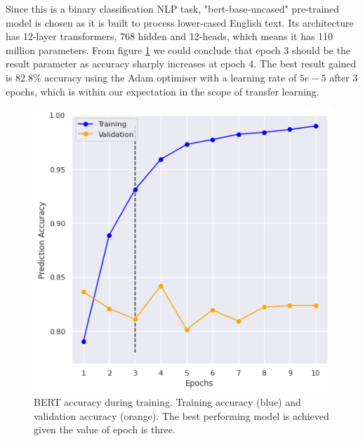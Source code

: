 \documentclass[journal, ]{IEEEtran}
\let\MYoriglatexcaption\caption
\renewcommand{\caption}[2][\relax]{\MYoriglatexcaption[#2]{#2}}
\begin{document}
Since this is a binary classification NLP task, "bert-base-uncased" pre-trained model is chosen as it is built to process lower-cased English text. Its architecture has 12-layer transformers, 768 hidden and 12-heads, which means it has 110 million parameters. From figure \ref{fig:bert_acc} we could conclude that epoch 3 should be the result parameter as accuracy sharply increases at epoch 4. The best result gained is $82.8$\% accuracy using the Adam optimiser with a learning rate of $5e-5$ after $3$ epochs, which is within our expectation in the scope of transfer learning.



\begin{figure}[hbt!]
  \centering
  \includegraphics[width=\linewidth]{imgs/BERT_ACC.png}
  \caption{BERT accuracy during training. Training accuracy (blue) and validation accuracy (orange). The best performing model is achieved given the value of epoch is three.}
  \label{fig:bert_acc}
\end{figure}
\end{document}

